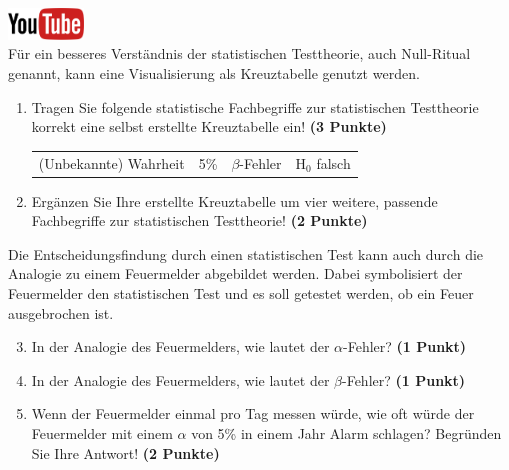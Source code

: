 \documentclass[a4paper, 9pt]{scrartcl}\usepackage[]{graphicx}\usepackage[]{xcolor}
\begin{document}
\hfill\href{https://youtu.be/Ric8ne39DtI}{\includegraphics[width =
  2cm]{img/youtube}}\\[1Ex]




F{\"u}r ein besseres Verst{\"a}ndnis der statistischen Testtheorie, auch
Null-Ritual genannt, kann eine Visualisierung als Kreuztabelle genutzt werden.  

\begin{enumerate}
\item Tragen Sie folgende statistische Fachbegriffe zur statistischen
  Testtheorie korrekt eine selbst erstellte Kreuztabelle ein! \textbf{(3
    Punkte)}
  \begin{center}
  \begin{tabular}{cccc}
  (Unbekannte) Wahrheit & 5\% & $\beta$-Fehler & H$_0$ falsch \\
  \end{tabular}
  \end{center}
\item Erg{\"a}nzen Sie Ihre erstellte Kreuztabelle um vier weitere, passende
  Fachbegriffe zur statistischen Testtheorie! \textbf{(2 Punkte)}
\end{enumerate}

Die Entscheidungsfindung durch einen statistischen Test kann auch durch die
Analogie zu einem Feuermelder abgebildet werden. Dabei symbolisiert der
Feuermelder den statistischen Test und es soll getestet werden, ob ein Feuer
ausgebrochen ist.

\begin{enumerate}
  \setcounter{enumi}{2}    
\item In der Analogie des Feuermelders, wie lautet der $\alpha$-Fehler? \textbf{(1 Punkt)}
\item In der Analogie des Feuermelders, wie lautet der $\beta$-Fehler? \textbf{(1 Punkt)}
\item Wenn der Feuermelder einmal pro Tag messen w{\"u}rde, wie oft w{\"u}rde der
  Feuermelder mit einem $\alpha$ von 5\% in einem Jahr Alarm schlagen?
  Begr{\"u}nden Sie Ihre Antwort! \textbf{(2 Punkte)}
\end{enumerate}



 
\clearpage
\end{document}
